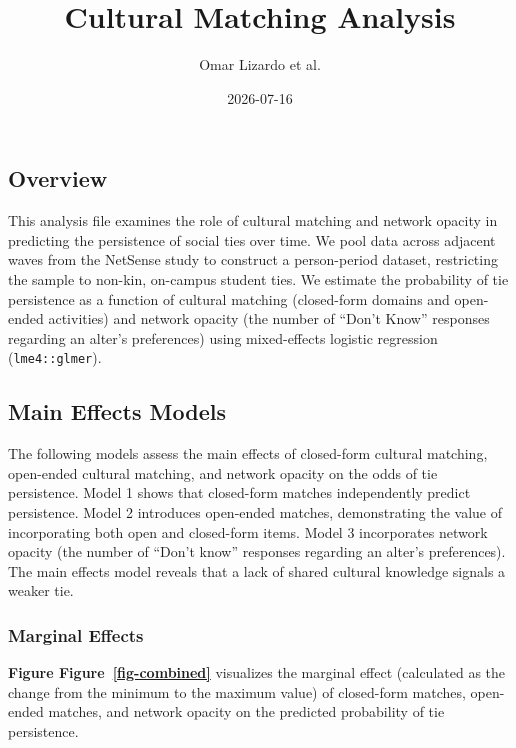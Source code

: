 \documentclass[
  letterpaper,
  DIV=11,
  numbers=noendperiod]{scrartcl}
\title{Cultural Matching Analysis}
\author{Omar Lizardo et al.}
\date{2026-07-16}
\renewcommand*\contentsname{Table of contents}
\newcommand\contentsname{Table of contents}
\begin{document}
\maketitle

\renewcommand*\contentsname{Table of contents}
{
\setcounter{tocdepth}{3}
\tableofcontents
}

\subsection{Overview}\label{overview}

This analysis file examines the role of cultural matching and network
opacity in predicting the persistence of social ties over time. We pool
data across adjacent waves from the NetSense study to construct a
person-period dataset, restricting the sample to non-kin, on-campus
student ties. We estimate the probability of tie persistence as a
function of cultural matching (closed-form domains and open-ended
activities) and network opacity (the number of ``Don't Know'' responses
regarding an alter's preferences) using mixed-effects logistic
regression (\texttt{lme4::glmer}).

\subsection{Main Effects Models}\label{main-effects-models}

The following models assess the main effects of closed-form cultural
matching, open-ended cultural matching, and network opacity on the odds
of tie persistence. Model 1 shows that closed-form matches independently
predict persistence. Model 2 introduces open-ended matches,
demonstrating the value of incorporating both open and closed-form
items. Model 3 incorporates network opacity (the number of ``Don't
know'' responses regarding an alter's preferences). The main effects
model reveals that a lack of shared cultural knowledge signals a weaker
tie.

\subsubsection{Marginal Effects}\label{marginal-effects}

\textbf{Figure Figure~\ref{fig-combined}} visualizes the marginal effect
(calculated as the change from the minimum to the maximum value) of
closed-form matches, open-ended matches, and network opacity on the
predicted probability of tie persistence.
\end{document}
